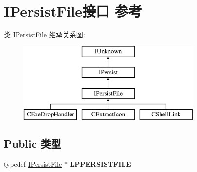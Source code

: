 \hypertarget{interface_i_persist_file}{}\section{I\+Persist\+File接口 参考}
\label{interface_i_persist_file}
类 I\+Persist\+File 继承关系图\+:\begin{figure}[H]
\begin{center}
\leavevmode
\includegraphics[height=4.000000cm]{interface_i_persist_file}
\end{center}
\end{figure}
\subsection*{Public 类型}
\begin{DoxyCompactItemize}
\item 
\mbox{\label{interface_i_persist_file_a501cd72258f1b0df1a1234a72d1aff3d}} 
typedef \hyperlink{interface_i_persist_file}{I\+Persist\+File} $\ast$ {\bfseries L\+P\+P\+E\+R\+S\+I\+S\+T\+F\+I\+LE}
\end{DoxyCompactItemize}
